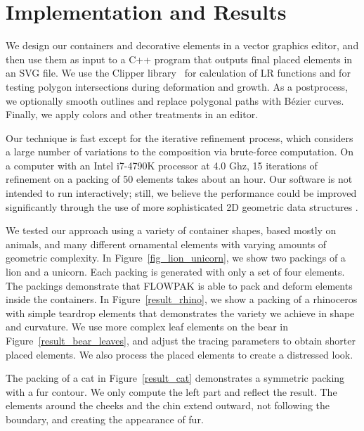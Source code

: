 \section{Implementation and Results}
\label{flowpak_implementation_and_results}



We design our containers and decorative elements in a vector graphics 
editor, and then use them as input to a C++ program that outputs final
placed elements in an SVG file.  We use the Clipper library~\cite{ClipperLib}
for calculation of LR functions and for testing polygon intersections 
during deformation and growth.
As a postprocess, we optionally smooth outlines and replace polygonal
paths with B\'{e}zier curves.
Finally, we apply colors and other treatments in an editor.

Our technique is fast except for the iterative refinement process,
which considers a large number of variations to the composition via
brute-force computation. On a computer with an Intel i7-4790K processor at 4.0 Ghz,
 15 iterations
of refinement on a packing of 50 elements takes about an hour.  Our
software is not intended to run interactively; still, we believe the
performance could be improved significantly through the use of more
sophisticated 2D geometric data structures .

We tested our approach using a variety of container shapes, based mostly
on animals, and many different ornamental elements with varying amounts
of geometric complexity.
In Figure~\ref{fig_lion_unicorn}, we show two packings of a lion and a unicorn.
Each packing is generated with only a set of four elements.
The packings demonstrate that FLOWPAK is able to pack and deform
elements inside the containers.
In Figure~\ref{result_rhino},
we show a packing of a rhinoceros with simple teardrop elements
that demonstrates the variety we achieve in shape and curvature.
We use more complex leaf elements on the bear in 
Figure~\ref{result_bear_leaves}, and
adjust the tracing parameters to obtain shorter placed elements. 
We also process the placed elements to create a distressed look.

The packing of a cat in Figure~\ref{result_cat} demonstrates 
a symmetric packing with a fur contour. 
We only compute the left part and reflect the result.
The elements around the cheeks and the chin extend outward, not following the boundary, and creating the appearance of fur.

